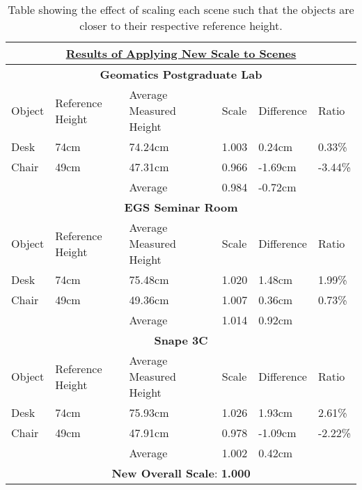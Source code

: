\vspace{1cm}
\begin{table}[h!]
	\centering
	\begin{tabular}{|p{1.25cm}|p{2cm}|p{3.5cm}|p{1.85cm}|p{2cm}|p{1.25cm}|}
		\hline
		\multicolumn{6}{|c|}{\textbf{\underline{Results of Applying New Scale to Scenes}}} \\
		\hline
		\multicolumn{6}{|c|}{\textbf{Geomatics Postgraduate Lab}} \\
		\hline
		Object & Reference Height & Average Measured Height & Scale & Difference & Ratio \\
		\hline
		Desk & 74cm & 74.24cm & 1.003 & 0.24cm & 0.33\% \\
		Chair & 49cm & 47.31cm & 0.966 & -1.69cm & -3.44\% \\
		\hline
		& & Average & 0.984 & -0.72cm &\\
		\hline
		\multicolumn{6}{|c|}{\textbf{EGS Seminar Room}} \\
		\hline
		Object & Reference Height & Average Measured Height & Scale & Difference & Ratio \\
		\hline
		Desk & 74cm & 75.48cm & 1.020 & 1.48cm & 1.99\% \\
		Chair & 49cm & 49.36cm & 1.007 & 0.36cm & 0.73\% \\
		\hline
		& & Average & 1.014 & 0.92cm &\\
		\hline
		\multicolumn{6}{|c|}{\textbf{Snape 3C}} \\
		\hline
		Object & Reference Height & Average Measured Height & Scale & Difference & Ratio \\
		\hline
		Desk & 74cm & 75.93cm & 1.026 & 1.93cm & 2.61\% \\
		Chair & 49cm & 47.91cm & 0.978 & -1.09cm & -2.22\% \\
		\hline
		& & Average & 1.002 & 0.42cm &\\
		\hline
		\multicolumn{6}{|c|}{\textbf{New Overall Scale}: \textbf{1.000}}\\
		\hline
	\end{tabular}
	\caption[The effect of scaling the scene to get closer to the reference heights]{Table showing the effect of scaling each scene such that the objects are closer to their respective reference height.}
	\label{scale2}
\end{table}
\vspace{1cm}

